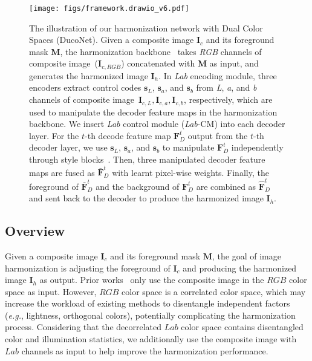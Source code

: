 \documentclass[sigconf]{acmart}
\begin{document}
\begin{figure*}[ht]
  \centering
  \texttt{[image: figs/framework.drawio\_v6.pdf]}
  \caption{The illustration of our harmonization network with Dual Color Spaces (DucoNet). 
  Given a composite image $\bm{I}_{c}$ and its foreground mask $\bm{M}$, the harmonization backbone~\cite{issam} takes \textit{RGB} channels of composite image~($\bm{I}_{c,RGB}$) concatenated with $\bm{M}$ as input, and generates the harmonized image $\bm{I}_{h}$. 
  In \textit{Lab} encoding module, three encoders extract control codes $\bm{s}_{\textit{L}}$, $\bm{s}_{\textit{a}}$, and $\bm{s}_{\textit{b}}$ from \textit{L}, \textit{a}, and \textit{b} channels of composite image~$\bm{I}_{c, \textit{L}}, \bm{I}_{c, \textit{a}}, \bm{I}_{c, \textit{b}}$, respectively,
  which are used to manipulate the decoder feature maps in the harmonization backbone. 
  We insert \textit{Lab} control module (\textit{Lab}-CM) into each decoder layer. For the $t$-th decode feature map $\bm{F}_{D}^{t}$ output from the $t$-th decoder layer, 
  we use $\bm{s}_{\textit{L}}$, $\bm{s}_{\textit{a}}$, and $\bm{s}_{\textit{b}}$ to manipulate $\bm{F}_{D}^{t}$ independently through style blocks~\cite{styleganv2}. 
  Then, three manipulated decoder feature maps are fused as $\bm{\bar{F}}_{D}^{t}$ with learnt pixel-wise weights. 
  Finally, the foreground of $\bm{\bar{F}}_{D}^{t}$ and the background of $\bm{{F}}_{D}^{t}$ are combined as $\bm{\hat{F}}_{D}^{t}$ and sent back to the decoder to produce the harmonized image $\bm{I}_{h}$.}
  \Description{}
  \label{fig:framework}
\end{figure*}


\subsection{Overview}\label{Overview}

Given a composite image $\bm{I}_{c}$ and its foreground mask $\bm{M}$, the goal of image harmonization is adjusting the foreground of $\bm{I}_{c}$ and producing the harmonized image $\bm{I}_{h}$ as output. 
Prior works~\cite{issam, CDTNet, dovenet, harmonizer, IHT} only use the composite image in the $RGB$ color space as input. 
However, $RGB$ color space is a correlated color space, which may increase the workload of existing methods to disentangle independent factors (\emph{e.g.}, lightness, orthogonal colors), potentially complicating the harmonization process.
Considering that the decorrelated $Lab$ color space contains disentangled color and illumination statistics, we additionally use the composite image with $Lab$ channels as input to help improve the  harmonization performance. 
\end{document}
